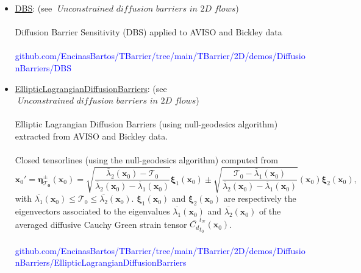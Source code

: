 \documentclass{article}
\begin{document}
\begin{enumerate}
\begin{enumerate}
\begin{enumerate}
\begin{itemize}
\item \href{https://github.com/EncinasBartos/TBarrier/tree/main/TBarrier/2D/demos/DiffusionBarriers/DBS}{\underline{DBS}}: (see $ \textit{ Unconstrained diffusion barriers in 2D flows} $) \\ \\
Diffusion Barrier Sensitivity (DBS) applied to AVISO and Bickley data \\ \\
\textcolor{blue}{{\footnotesize github.com/EncinasBartos/TBarrier/tree/main/TBarrier/2D/demos/DiffusionBarriers/DBS}} \\
\item \href{https://github.com/EncinasBartos/TBarrier/tree/main/TBarrier/2D/demos/DiffusionBarriers/EllipticLagrangianDiffusionBarriers}{\underline{EllipticLagrangianDiffusionBarriers}}: (see $ \textit{ Unconstrained diffusion barriers in 2D flows} $) \\ \\
Elliptic Lagrangian Diffusion Barriers (using null-geodesics algorithm) extracted from AVISO and Bickley data. \\ \\
Closed tensorlines (using the null-geodesics algorithm) computed from
\begin{equation}
\mathbf{x}_0' = \mathbf{\eta_{\mathcal{T}_0}^{\pm}}(\mathbf{x}_0) = \sqrt{\frac{\overline{\lambda}_2(\mathbf{x}_0)-\mathcal{T}_0}{\overline{\lambda}_2(\mathbf{x}_0)-\overline{\lambda}_1(\mathbf{x}_0)}} \mathbf{\xi}_1(\mathbf{x}_0) \pm \sqrt{\frac{\mathcal{T}_0-\overline{\lambda}_1(\mathbf{x}_0)}{\overline{\lambda}_2(\mathbf{x}_0)-\overline{\lambda}_1(\mathbf{x}_0)}}(\mathbf{x}_0)\mathbf{\xi}_2(\mathbf{x}_0),
\label{eq: diffusive_tensorlines}
\end{equation} with $ \overline{\lambda_1} (\mathbf{x}_0) \leq \mathcal{T}_0 \leq   \overline{\lambda_2} (\mathbf{x}_0) $. $ \mathbf{\xi}_1(\mathbf{x}_0) $ and $ \mathbf{\xi}_2(\mathbf{x}_0) $ are respectively the eigenvectors associated to the eigenvalues $ \overline{\lambda_1} (\mathbf{x}_0) $ and $ \overline{\lambda_2} (\mathbf{x}_0) $ of the averaged diffusive Cauchy Green strain tensor $  \overline{C_d}_{t_0}^{t_N}(\mathbf{x}_0)$. \\ \\
\textcolor{blue}{{\footnotesize github.com/EncinasBartos/TBarrier/tree/main/TBarrier/2D/demos/DiffusionBarriers/EllipticLagrangianDiffusionBarriers}} \\ \\

\end{itemize}
\end{enumerate}
\end{enumerate}
\end{enumerate}
\end{document}

